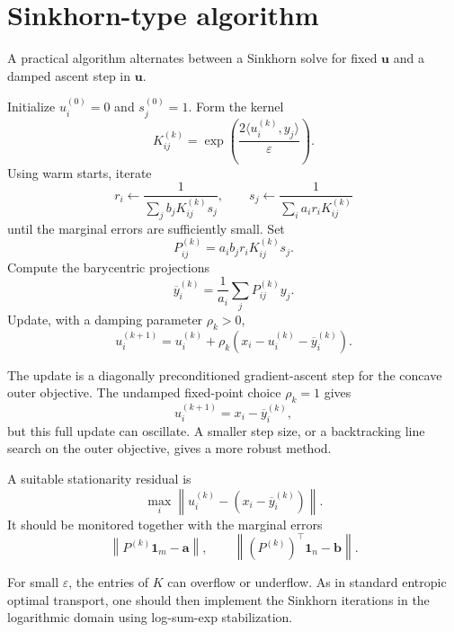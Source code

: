 \documentclass[11pt]{article}
\begin{document}
\section{Sinkhorn-type algorithm}

A practical algorithm alternates between a Sinkhorn solve for fixed
$\bm{u}$ and a damped ascent step in $\bm{u}$.

\begin{algorithm}[h]
\caption{Damped Sinkhorn iteration for weak entropic transport}
\begin{algorithmic}[1]
\STATE Initialize $u_i^{(0)}=0$ and $s_j^{(0)}=1$.
    \STATE Form the kernel
    \[
        K_{ij}^{(k)}
        =
        \exp\left(
            \frac{2\langle u_i^{(k)},y_j\rangle}{\varepsilon}
        \right).
    \]
    \STATE Using warm starts, iterate
    \[
        r_i
        \leftarrow
        \frac{1}{\sum_j b_jK_{ij}^{(k)}s_j},
        \qquad
        s_j
        \leftarrow
        \frac{1}{\sum_i a_ir_iK_{ij}^{(k)}}
    \]
    until the marginal errors are sufficiently small.
    \STATE Set
    \[
        P_{ij}^{(k)}
        =
        a_i b_jr_iK_{ij}^{(k)}s_j.
    \]
    \STATE Compute the barycentric projections
    \[
        \overline{y}_i^{(k)}
        =
        \frac{1}{a_i}
        \sum_j P_{ij}^{(k)}y_j.
    \]
    \STATE Update, with a damping parameter $\rho_k>0$,
    \[
        u_i^{(k+1)}
        =
        u_i^{(k)}
        +
        \rho_k
        \left(
            x_i-u_i^{(k)}-\overline{y}_i^{(k)}
        \right).
    \]
\ENDFOR
\end{algorithmic}
\end{algorithm}

The update is a diagonally preconditioned gradient-ascent step for the
concave outer objective. The undamped fixed-point choice $\rho_k=1$ gives
\[
    u_i^{(k+1)}
    =
    x_i-\overline{y}_i^{(k)},
\]
but this full update can oscillate. A smaller step size, or a backtracking
line search on the outer objective, gives a more robust method.

A suitable stationarity residual is
\[
    \max_i
    \left\|
        u_i^{(k)}
        -
        \left(x_i-\overline{y}_i^{(k)}\right)
    \right\|.
\]
It should be monitored together with the marginal errors
\[
    \left\|P^{(k)}\bm{1}_m-\bm{a}\right\|,
    \qquad
    \left\|(P^{(k)})^\top\bm{1}_n-\bm{b}\right\|.
\]

For small $\varepsilon$, the entries of $K$ can overflow or underflow.
As in standard entropic optimal transport, one should then implement the
Sinkhorn iterations in the logarithmic domain using log-sum-exp
stabilization.
\end{document}
